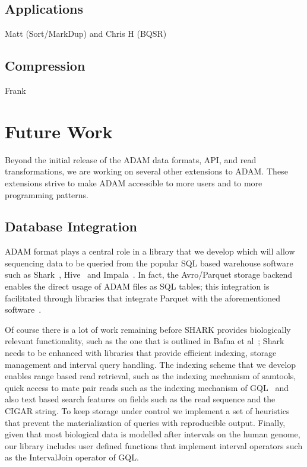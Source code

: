 \documentclass[10pt,twocolumn]{article}
\begin{document}
\subsection{Applications}
\label{sec:applications}

Matt (Sort/MarkDup) and Chris H (BQSR)

\subsection{Compression}
\label{sec:compression}

Frank

\section{Future Work}
\label{sec:future-work}

Beyond the initial release of the ADAM data formats, API, and read transformations, we are working on several other
extensions to ADAM. These extensions strive to make ADAM accessible to more users and to more programming patterns.

\subsection{Database Integration}
\label{sec:database-integration}

ADAM format plays a central role in a library that we develop which will allow sequencing data to be queried from 
the popular SQL based warehouse software such as Shark~\cite{shark}, Hive~\cite{hive} and Impala~\cite{impala}. In fact,
the Avro/Parquet storage backend enables the direct usage of ADAM files as SQL tables; this integration is facilitated through libraries 
that integrate Parquet with the aforementioned software~\cite{parquet}.

Of course there is a lot of work remaining before SHARK provides biologically relevant functionality,
such as the one that is outlined in Bafna et al~\cite{bafna2013}; Shark needs to be enhanced with libraries that provide
efficient indexing, storage management and interval query handling. The indexing scheme that we develop enables
range based read retrieval, such as the indexing mechanism of samtools, quick access to mate pair reads such as the
indexing mechanism of GQL~\cite{kozanitis13} and also text based search features on fields such as the read sequence
and the CIGAR string. To keep storage under control we implement a set of heuristics that prevent the materialization of
queries with reproducible output. Finally, given that most biological data is modelled after intervals on the human genome,
our library includes user defined functions that implement interval operators such as the IntervalJoin operator of GQL.
\end{document}
